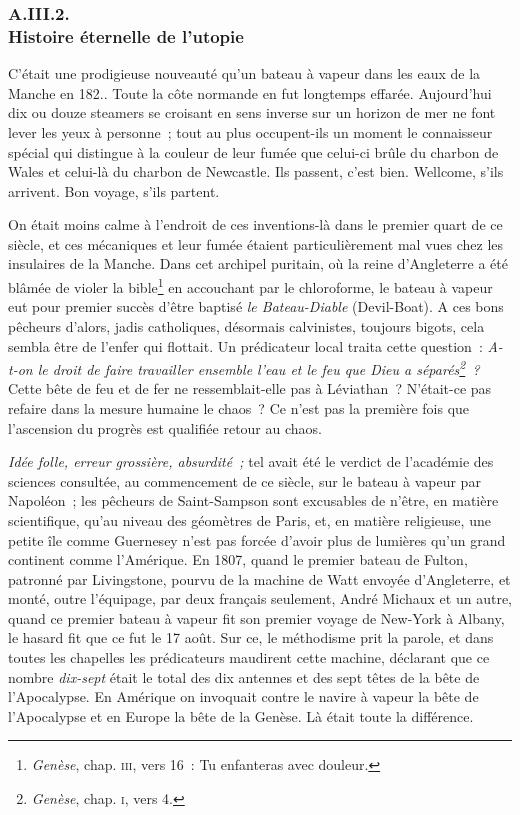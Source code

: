 \documentclass[french,twoside]{book} %
\begin{document}
 \subsubsection[{A.III.2. Histoire éternelle de l’utopie}]{A.III.2. \\
Histoire éternelle de l’utopie}
\noindent C’était une prodigieuse nouveauté qu’un bateau à vapeur dans les eaux de la Manche en 182.. Toute la côte normande en fut longtemps effarée. Aujourd’hui dix ou douze steamers se croisant en sens inverse sur un horizon de mer ne font lever les yeux à personne ; tout au plus occupent-ils un moment le connaisseur spécial qui distingue à la couleur de leur fumée que celui-ci brûle du charbon de Wales et celui-là du charbon de Newcastle. Ils passent, c’est bien. Wellcome, s’ils arrivent. Bon voyage, s’ils partent.\par
On était moins calme à l’endroit de ces inventions-là dans le premier quart de ce siècle, et ces mécaniques et leur fumée étaient particulièrement mal vues chez les insulaires de la Manche. Dans cet archipel puritain, où la reine d’Angleterre a été blâmée de violer la bible\footnote{ \noindent \emph{Genèse}, chap. {\scshape iii}, vers 16 : Tu enfanteras avec douleur.
 } en accouchant par le chloroforme, le bateau à  vapeur eut pour premier succès d’être baptisé \emph{le Bateau-Diable} (Devil-Boat). A ces bons pêcheurs d’alors, jadis catholiques, désormais calvinistes, toujours bigots, cela sembla être de l’enfer qui flottait. Un prédicateur local traita cette question : \emph{A-t-on le droit de faire travailler ensemble l’eau et le feu que Dieu a séparés\footnote{ \noindent \emph{Genèse}, chap. {\scshape i}, vers 4.
 } ?} Cette bête de feu et de fer ne ressemblait-elle pas à Léviathan ? N’était-ce pas refaire dans la mesure humaine le chaos ? Ce n’est pas la première fois que l’ascension du progrès est qualifiée retour au chaos.\par
\emph{Idée folle, erreur grossière, absurdité ;} tel avait été le verdict de l’académie des sciences consultée, au commencement de ce siècle, sur le bateau à vapeur par Napoléon ; les pêcheurs de Saint-Sampson sont excusables de n’être, en matière scientifique, qu’au niveau des géomètres de Paris, et, en matière religieuse, une petite île comme Guernesey n’est pas forcée d’avoir plus de lumières qu’un grand continent comme l’Amérique. En 1807, quand le premier bateau de Fulton, patronné par Livingstone, pourvu de la machine de Watt envoyée d’Angleterre, et monté, outre l’équipage, par deux français seulement, André Michaux et un autre, quand ce premier bateau à vapeur fit son premier voyage de New-York à Albany, le hasard fit que ce fut le 17 août. Sur ce, le méthodisme prit la parole, et dans toutes les chapelles les prédicateurs maudirent cette machine, déclarant que ce nombre \emph{dix-sept} était le total des dix antennes et des sept têtes  de la bête de l’Apocalypse. En Amérique on invoquait contre le navire à vapeur la bête de l’Apocalypse et en Europe la bête de la Genèse. Là était toute la différence.\par
\end{document}
